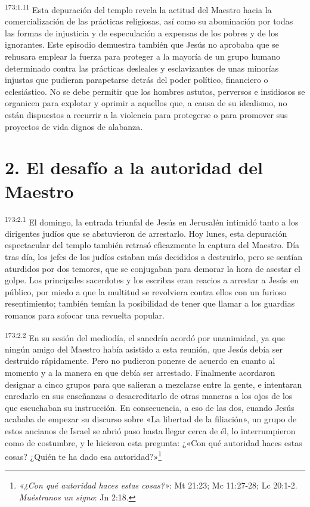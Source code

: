 \par 
\textsuperscript{173:1.11} Esta depuración del templo revela la actitud del Maestro hacia la comercialización de las prácticas religiosas, así como su abominación por todas las formas de injusticia y de especulación a expensas de los pobres y de los ignorantes. Este episodio demuestra también que Jesús no aprobaba que se rehusara emplear la fuerza para proteger a la mayoría de un grupo humano determinado contra las prácticas desleales y esclavizantes de unas minorías injustas que pudieran parapetarse detrás del poder político, financiero o eclesiástico. No se debe permitir que los hombres astutos, perversos e insidiosos se organicen para explotar y oprimir a aquellos que, a causa de su idealismo, no están dispuestos a recurrir a la violencia para protegerse o para promover sus proyectos de vida dignos de alabanza.

\section*{2. El desafío a la autoridad del Maestro}
\par 
\textsuperscript{173:2.1} El domingo, la entrada triunfal de Jesús en Jerusalén intimidó tanto a los dirigentes judíos que se abstuvieron de arrestarlo. Hoy lunes, esta depuración espectacular del templo también retrasó eficazmente la captura del Maestro. Día tras día, los jefes de los judíos estaban más decididos a destruirlo, pero se sentían aturdidos por dos temores, que se conjugaban para demorar la hora de asestar el golpe. Los principales sacerdotes y los escribas eran reacios a arrestar a Jesús en público, por miedo a que la multitud se revolviera contra ellos con un furioso resentimiento; también temían la posibilidad de tener que llamar a los guardias romanos para sofocar una revuelta popular.

\par 
\textsuperscript{173:2.2} En su sesión del mediodía, el sanedrín acordó por unanimidad, ya que ningún amigo del Maestro había asistido a esta reunión, que Jesús debía ser destruido rápidamente. Pero no pudieron ponerse de acuerdo en cuanto al momento y a la manera en que debía ser arrestado. Finalmente acordaron designar a cinco grupos para que salieran a mezclarse entre la gente, e intentaran enredarlo en sus enseñanzas o desacreditarlo de otras maneras a los ojos de los que escuchaban su instrucción. En consecuencia, a eso de las dos, cuando Jesús acababa de empezar su discurso sobre «La libertad de la filiación», un grupo de estos ancianos de Israel se abrió paso hasta llegar cerca de él, lo interrumpieron como de costumbre, y le hicieron esta pregunta: ¿«Con qué autoridad haces estas cosas? ¿Quién te ha dado esa autoridad?»\footnote{\textit{«¿Con qué autoridad haces estas cosas?»}: Mt 21:23; Mc 11:27-28; Lc 20:1-2. \textit{Muéstranos un signo}: Jn 2:18.}

